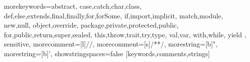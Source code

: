 

%
{morekeywords={abstract,%
  case,catch,char,class,%
  def,else,extends,final,finally,for,forSome,%
  if,import,implicit,%
  match,module,%
  new,null,%
  object,override,%
  package,private,protected,public,%
  for,public,return,super,sealed,%
  this,throw,trait,try,type,%
  val,var,%
  with,while,%
  yield%
  },%
  sensitive,%
  morecomment=[l]//,%
  morecomment=[s]{/*}{*/},%
  morestring=[b]",%
  morestring=[b]',%
  showstringspaces=false%
}[keywords,comments,strings]%





  




    
